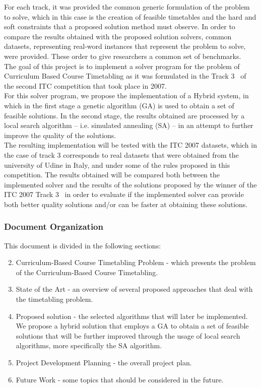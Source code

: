 For each track, it was provided the common generic formulation of the problem to solve, which in this case is the creation of feasible timetables and the hard and soft constraints that a proposed solution method must observe. In order to compare the results obtained with the proposed solution solvers, common datasets, representing real-word instances that represent the problem to solve, were provided. These order to give researchers a common set of benchmarks.\\
The goal of this project is to implement a solver program for the problem of Curriculum Based Course Timetabling as it was formulated in the Track 3~\cite{McCollum2010} of the second ITC competition that took place in 2007.\\
For this solver program, we propose the implementation of a Hybrid system, in which in the first stage a genetic algorithm (GA) is used to obtain a set of feasible solutions. In the second stage, the results obtained are processed by a local search algorithm – i.e. simulated annealing (SA) – in an attempt to further improve the quality of the solutions.\\
The resulting implementation will be tested with the ITC 2007 datasets, which in the case of track 3 corresponds to real datasets that were obtained from the university of Udine in Italy, and under some of the rules proposed in this competition. The results obtained will be compared both between the implemented solver and the results of the solutions proposed by the winner of the ITC 2007 Track 3~\cite{Mueller2007} in order to evaluate if the implemented solver can provide both better quality solutions and/or can be faster at obtaining these solutions.\\
\subsubsection{Document Organization}
This document is divided in the following sections:
\begin{enumerate}
\setcounter{enumi}{1}
\item Curriculum-Based Course Timetabling Problem - which presents the problem of the Curriculum-Based Course Timetabling.
\item State of the Art - an overview of several proposed approaches that deal with the timetabling problem.
\item Proposed solution - the selected algorithms that will later be implemented. We propose a hybrid solution that employs a GA to obtain a set of feasible solutions that will be further improved through the usage of local search algorithms, more specifically the SA algorithm.
\item Project Development Planning - the overall project plan.
\item Future Work - some topics that should be considered in the future.
\end{enumerate}
